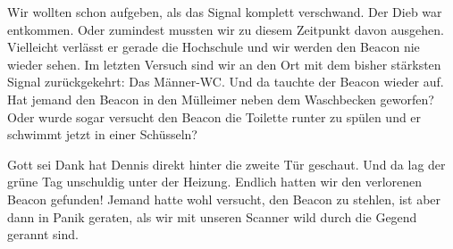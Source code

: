 Wir wollten schon aufgeben, als das Signal komplett verschwand. Der Dieb
war entkommen. Oder zumindest mussten wir zu diesem Zeitpunkt davon ausgehen.
Vielleicht verlässt er gerade die Hochschule und wir werden den Beacon nie
wieder sehen. Im letzten Versuch sind wir an den Ort mit dem bisher stärksten
Signal zurückgekehrt: Das Männer-WC. Und da tauchte der Beacon wieder auf.
Hat jemand den Beacon in den Mülleimer neben dem Waschbecken geworfen? Oder
wurde sogar versucht den Beacon die Toilette runter zu spülen und er schwimmt
jetzt in einer Schüsseln?

Gott sei Dank hat Dennis direkt hinter die zweite Tür geschaut. Und da lag
der grüne Tag unschuldig unter der Heizung. Endlich hatten wir den verlorenen
Beacon gefunden! Jemand hatte wohl versucht, den Beacon zu stehlen, ist aber
dann in Panik geraten, als wir mit unseren Scanner wild durch die Gegend
gerannt sind. 
